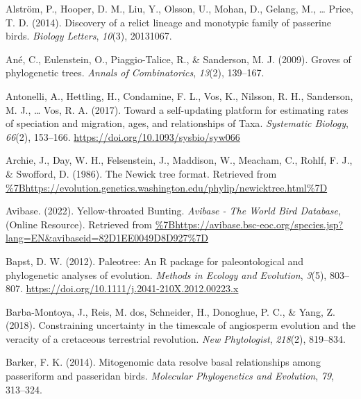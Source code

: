\documentclass[
  english,
  man]{apa6}
\newlength{\cslhangindent}
\newlength{\cslentryspacingunit} %
\newenvironment{CSLReferences}[2] %
 {%
  \setlength{\parindent}{0pt}
  \ifodd #1
  \let\oldpar\par
  \def\par{\hangindent=\cslhangindent\oldpar}
  \fi
  \setlength{\parskip}{#2\cslentryspacingunit}
 }%
 {}
\begin{document}
\hypertarget{refs}{}
\begin{CSLReferences}{1}{0}
\leavevmode{}%
Alström, P., Hooper, D. M., Liu, Y., Olsson, U., Mohan, D., Gelang, M., \ldots{} Price, T. D. (2014). Discovery of a relict lineage and monotypic family of passerine birds. \emph{Biology Letters}, \emph{10}(3), 20131067.

\leavevmode{}%
Ané, C., Eulenstein, O., Piaggio-Talice, R., \& Sanderson, M. J. (2009). Groves of phylogenetic trees. \emph{{Annals of Combinatorics}}, \emph{13}(2), 139--167.

\leavevmode{}%
Antonelli, A., Hettling, H., Condamine, F. L., Vos, K., Nilsson, R. H., Sanderson, M. J., \ldots{} Vos, R. A. (2017). {Toward a self-updating platform for estimating rates of speciation and migration, ages, and relationships of Taxa}. \emph{Systematic Biology}, \emph{66}(2), 153--166. \url{https://doi.org/10.1093/sysbio/syw066}

\leavevmode{}%
Archie, J., Day, W. H., Felsenstein, J., Maddison, W., Meacham, C., Rohlf, F. J., \& Swofford, D. (1986). {The Newick tree format}. Retrieved from \url{\%7Bhttps://evolution.genetics.washington.edu/phylip/newicktree.html\%7D}

\leavevmode{}%
Avibase. (2022). {Yellow-throated Bunting}. \emph{{Avibase - The World Bird Database}}, (Online Resource). Retrieved from \url{\%7Bhttps://avibase.bsc-eoc.org/species.jsp?lang=EN\&avibaseid=82D1EE0049D8D927\%7D}

\leavevmode{}%
Bapst, D. W. (2012). {Paleotree: An R package for paleontological and phylogenetic analyses of evolution}. \emph{{Methods in Ecology and Evolution}}, \emph{3}(5), 803--807. \url{https://doi.org/10.1111/j.2041-210X.2012.00223.x}

\leavevmode{}%
Barba-Montoya, J., Reis, M. dos, Schneider, H., Donoghue, P. C., \& Yang, Z. (2018). Constraining uncertainty in the timescale of angiosperm evolution and the veracity of a cretaceous terrestrial revolution. \emph{New Phytologist}, \emph{218}(2), 819--834.

\leavevmode{}%
Barker, F. K. (2014). Mitogenomic data resolve basal relationships among passeriform and passeridan birds. \emph{Molecular Phylogenetics and Evolution}, \emph{79}, 313--324.


\end{CSLReferences}
\end{document}
